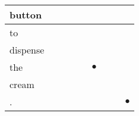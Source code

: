 \documentclass[landscape]{article}
\newcommand{\ssp}{\hspace{2pt}}
\newcommand{\mex}{\cellcolor{g}$\bullet$}
\begin{document}
\begin{tabular}{|l|p{10pt}|p{10pt}|p{10pt}|p{10pt}|p{10pt}|p{10pt}|p{10pt}|p{10pt}|}
\hline
\ssp button \ssp&\hspace{2pt}&\hspace{2pt}&\hspace{2pt}&\hspace{2pt}&\hspace{2pt}&\hspace{2pt}&\hspace{2pt}&\hspace{2pt}\\
\hline
\ssp to \ssp&\hspace{2pt}&\hspace{2pt}&\hspace{2pt}&\hspace{2pt}&\hspace{2pt}&\hspace{2pt}&\hspace{2pt}&\hspace{2pt}\\
\hline
\ssp dispense \ssp&\hspace{2pt}&\hspace{2pt}&\hspace{2pt}&\hspace{2pt}&\hspace{2pt}&\hspace{2pt}&\hspace{2pt}&\hspace{2pt}\\
\hline
\ssp \cellcolor{ref4}the \ssp&\hspace{2pt}&\hspace{2pt}&\hspace{2pt}&\hspace{2pt}&\hspace{2pt}\mex&\hspace{2pt}&\hspace{2pt}&\hspace{2pt}\\
\hline
\ssp cream \ssp&\hspace{2pt}&\hspace{2pt}&\hspace{2pt}&\hspace{2pt}&\hspace{2pt}&\hspace{2pt}&\hspace{2pt}&\hspace{2pt}\\
\hline
\ssp \cellcolor{ref7}. \ssp&\hspace{2pt}&\hspace{2pt}&\hspace{2pt}&\hspace{2pt}&\hspace{2pt}&\hspace{2pt}&\hspace{2pt}&\hspace{2pt}\mex\\
\hline
\end{tabular}
\end{document}
